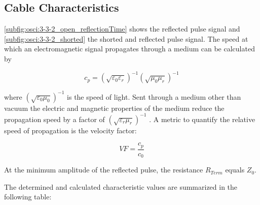     \subsection{Cable Characteristics}
        \cref{subfig:osci:3-3-2_open_reflectionTime} shows the reflected pulse signal and \cref{subfig:osci:3-3-2_shorted} the shorted and reflected
        pulse signal. The speed at which an electromagnetic signal propagates through a medium can be calculated by\par
        \begin{equation}
            c_p = \left(\sqrt{\varepsilon_0\varepsilon_r}\right)^{-1} \left(\sqrt{\mu_0\mu_r}\right)^{-1}
        \end{equation}\par
        where \( \left(\sqrt{\varepsilon_0\mu_0}\right)^{-1} \) is the speed of light. Sent through a medium other than
        vacuum the electric and magnetic properties of the medium reduce the propagation speed by a factor of \( \left(\sqrt{\varepsilon_r\mu_r}\right)^{-1} \) \cite{Halliday.2005}.
        A metric to quantify the relative speed of propagation is the velocity factor:\par
        \begin{equation}
            VF = \frac{c_p}{c_0}
        \end{equation}\par
        At the minimum amplitude of the reflected pulse, the resistance \( R_{Term} \) equals \( Z_0 \).\par
        The determined and calculated characteristic values are summarized in the following table:\par
